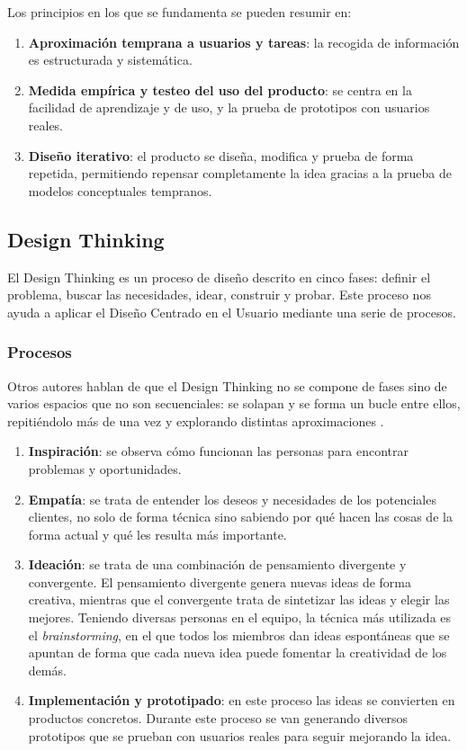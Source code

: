 Los principios\cite{jeffreyUCD} en los que se fundamenta se pueden resumir en:

\begin{enumerate}
    \item \textbf{Aproximación temprana a usuarios y tareas}: la recogida de información es estructurada y sistemática.
    \item \textbf{Medida empírica y testeo del uso del producto}: se centra en la facilidad de aprendizaje y de uso, y la prueba de prototipos con usuarios reales.
    \item \textbf{Diseño iterativo}: el producto se diseña, modifica y prueba de forma repetida, permitiendo repensar completamente la idea gracias a la prueba de modelos conceptuales tempranos.
\end{enumerate}

\subsection{Design Thinking}

El Design Thinking es un proceso de diseño descrito en cinco fases\cite{designThinkingPlattner}: definir el problema, buscar las necesidades, idear, construir y probar. Este proceso nos ayuda a aplicar el Diseño Centrado en el Usuario mediante una serie de procesos.

\subsubsection{Procesos}

Otros autores hablan de que el Design Thinking no se compone de fases sino de varios espacios que no son secuenciales: se solapan y se forma un bucle entre ellos, repitiéndolo más de una vez y explorando distintas aproximaciones \cite{designThinkingBrown}.

\begin{enumerate}
    \item \textbf{Inspiración}: se observa cómo funcionan las personas para encontrar problemas y oportunidades.
    \item \textbf{Empatía}: se trata de entender los deseos y necesidades de los potenciales clientes, no solo de forma técnica sino sabiendo por qué hacen las cosas de la forma actual y qué les resulta más importante.
    \item \textbf{Ideación}: se trata de una combinación de pensamiento divergente y convergente. El pensamiento divergente genera nuevas ideas de forma creativa, mientras que el convergente trata de sintetizar las ideas y elegir las mejores.
    Teniendo diversas personas en el equipo, la técnica más utilizada es el \textit{brainstorming}, en el que todos los miembros dan ideas espontáneas que se apuntan de forma que cada nueva idea puede fomentar la creatividad de los demás.
    \item \textbf{Implementación y prototipado}: en este proceso las ideas se convierten en productos concretos. Durante este proceso se van generando diversos prototipos que se prueban con usuarios reales para seguir mejorando la idea.
\end{enumerate}


